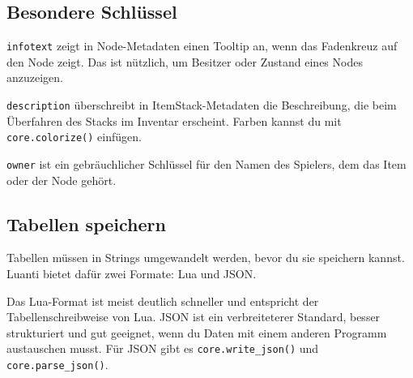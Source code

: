 \begin{Shaded}
\begin{Highlighting}[]
\OperatorTok{(}\OperatorTok{:}\OperatorTok{(}\OperatorTok{))} 
\OperatorTok{:}\OperatorTok{(}\OperatorTok{,} \OperatorTok{)}
\OperatorTok{(}\OperatorTok{:}\OperatorTok{(}\OperatorTok{))} 
\OperatorTok{(}\OperatorTok{:}\OperatorTok{(}\OperatorTok{))} 
\end{Highlighting}
\end{Shaded}

\subsection{Besondere Schlüssel}\label{besondere-schluxfcssel}

\texttt{infotext} zeigt in Node-Metadaten einen Tooltip an, wenn das
Fadenkreuz auf den Node zeigt. Das ist nützlich, um Besitzer oder
Zustand eines Nodes anzuzeigen.

\texttt{description} überschreibt in ItemStack-Metadaten die
Beschreibung, die beim Überfahren des Stacks im Inventar erscheint.
Farben kannst du mit
\texttt{core.\allowbreak{}colorize()}
einfügen.

\texttt{owner} ist ein gebräuchlicher Schlüssel für den Namen des
Spielers, dem das Item oder der Node gehört.

\subsection{Tabellen speichern}\label{tabellen-speichern}

Tabellen müssen in Strings umgewandelt werden, bevor du sie speichern
kannst. Luanti bietet dafür zwei Formate: Lua und JSON.

Das Lua-Format ist meist deutlich schneller und entspricht der
Tabellenschreibweise von Lua. JSON ist ein verbreiteterer Standard,
besser strukturiert und gut geeignet, wenn du Daten mit einem anderen
Programm austauschen musst. Für JSON gibt es
\texttt{core.\allowbreak{}write\_\allowbreak{}json()}
und
\texttt{core.\allowbreak{}parse\_\allowbreak{}json()}.

